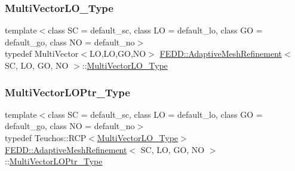 \subsubsection{\texorpdfstring{Multi\+Vector\+L\+O\+\_\+\+Type}{MultiVectorLO\_Type}}
{\footnotesize\ttfamily template$<$class SC = default\+\_\+sc, class LO = default\+\_\+lo, class GO = default\+\_\+go, class NO = default\+\_\+no$>$ \\
typedef Multi\+Vector$<$LO,LO,GO,NO$>$ \hyperlink{classFEDD_1_1AdaptiveMeshRefinement}{F\+E\+D\+D\+::\+Adaptive\+Mesh\+Refinement}$<$ SC, LO, GO, NO $>$\+::\hyperlink{classFEDD_1_1AdaptiveMeshRefinement_ae48fff0bc9a94bc0332516f1d1e05d92}{Multi\+Vector\+L\+O\+\_\+\+Type}}

\mbox{\label{classFEDD_1_1AdaptiveMeshRefinement_a838fdef10af2d85bf1259037b821019e}} 
\subsubsection{\texorpdfstring{Multi\+Vector\+L\+O\+Ptr\+\_\+\+Type}{MultiVectorLOPtr\_Type}}
{\footnotesize\ttfamily template$<$class SC = default\+\_\+sc, class LO = default\+\_\+lo, class GO = default\+\_\+go, class NO = default\+\_\+no$>$ \\
typedef Teuchos\+::\+R\+CP$<$\hyperlink{classFEDD_1_1AdaptiveMeshRefinement_ae48fff0bc9a94bc0332516f1d1e05d92}{Multi\+Vector\+L\+O\+\_\+\+Type}$>$ \hyperlink{classFEDD_1_1AdaptiveMeshRefinement}{F\+E\+D\+D\+::\+Adaptive\+Mesh\+Refinement}$<$ SC, LO, GO, NO $>$\+::\hyperlink{classFEDD_1_1AdaptiveMeshRefinement_a838fdef10af2d85bf1259037b821019e}{Multi\+Vector\+L\+O\+Ptr\+\_\+\+Type}}

\mbox{\label{classFEDD_1_1AdaptiveMeshRefinement_af4fb11adbdf1bba9bcaf8952324d32f2}} 
